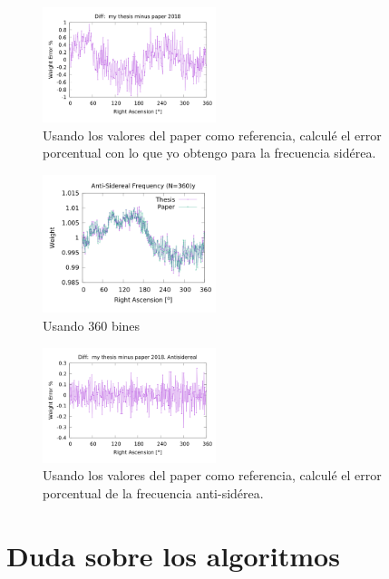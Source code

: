 \begin{figure}[H]
	\centering
	\includegraphics[width=0.45\textwidth]{sidereal_my_and_paper_in_360_error.png}
	\caption{Usando los valores del paper como referencia, calculé el error porcentual con lo que yo obtengo para la frecuencia sidérea.}
	\label{fig:error_360_sid}
\end{figure}



\begin{figure}[H]
	\centering
	\includegraphics[width=0.45\textwidth]{anti_my_and_paper_in_360.png}
	\caption{Usando 360 bines}
	\label{fig:anti_360}
\end{figure}


\begin{figure}[H]
	\centering
	\includegraphics[width=0.45\textwidth]{anti_my_and_paper_in_360_error.png}
	\caption{Usando los valores del paper como referencia, calculé el error porcentual de la frecuencia anti-sidérea.}
	\label{fig:error_360_anti}
\end{figure}



\section{Duda sobre los algoritmos}

